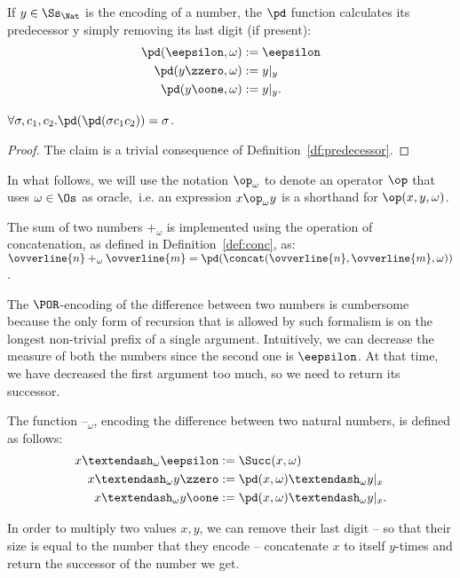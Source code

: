 \begin{defn}[Predecessor]\label{df:predecessor}
If $y\in \Ss_\Nat$ is the encoding
of a number,
the $\pd$ function calculates
its predecessor y simply removing its
last digit (if present):
\begin{align*}
\pd(\eepsilon,\omega) &:= \eepsilon \\
\pd(y\zzero,\omega) &:= y|_y \\
\pd(y\oone, \omega) &:= y|_y.
\end{align*}
\end{defn}

\begin{prop}
$\forall \sigma,c_1,c_2.\pd(\pd(\sigma c_1c_2))=\sigma$.
\end{prop}
\begin{proof}
The claim is a trivial consequence of Definition~\ref{df:predecessor}.
\end{proof}


\begin{notation}
In what follows, we will use the notation
$\op_\omega$ to denote an operator $\op$
that uses {$\omega \in \Os$} as oracle,~i.e.
an expression $x\op_\omega y$
is a shorthand for $\op(x,y,\omega)$.
\end{notation}


\begin{defn}[Sum]
The sum of two numbers $+_\omega$
is implemented using the operation of concatenation,
as defined in Definition~\ref{def:conc}, as:
${\ovverline{n}} +_\omega
{\ovverline{m}} = \pd
(\concat({\ovverline{n},\ovverline{m}},\omega))$.
\end{defn}


The $\POR$-encoding of the difference
between two numbers is cumbersome
because the only form of recursion that is
allowed by such formalism
is on the longest non-trivial
prefix of a single argument.
Intuitively, we can decrease the measure
of both the numbers
since the second one is $\eepsilon$.
At that time, we have decreased the first
argument too much, so we need to
return its successor.

\begin{defn}[Difference]
The function $–_\omega$, encoding
the difference between two natural numbers,
is defined as follows:
\begin{align*}
x –_\omega \eepsilon &:= {\Succ(x,\omega)} \\
x –_\omega y\zzero &:= \pd(x,\omega) –_\omega y|_x \\
x –_\omega y\oone &:= \pd(x,\omega) –_\omega
y|_x.
\end{align*}
\end{defn}
%
%
\noindent
In order to multiply two values $x,y$,
we can remove their last digit $–$ so that their size
is equal to the number that they encode $–$
concatenate $x$ to itself $y$-times and
return the successor of the number we get.


